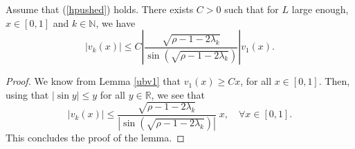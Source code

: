 \documentclass[11pt]{article}
\theoremstyle{plain}
\newtheorem{cor}[lemma]{Corollary}
\begin{document}
\begin{appendix}
%

\begin{lem}
Assume that (\ref{hpushed}) holds. There exists $C>0$ such that for $L$ large enough, $x\in[0,1]$ and $k\in \mathbb{N}$, we have
\begin{equation*}
   \left|{v_k(x)}\right|\leqslant C  \left| \frac{\sqrt{\rho-1-2\lambda_k}}{\sin(\sqrt{\rho-1-2\lambda_k})}\right|v_1(x).
\end{equation*}
\end{lem}
\begin{proof} We know from Lemma \ref{ubv1} that $v_1(x)\geqslant Cx$, for all $x\in[0,1]$. Then, using that $|\sin y|\leqslant y$ for all $y\in\mathbb{R}$, we see that
\begin{equation*}
|v_k(x)|\leqslant \frac{\sqrt{\rho-1-2\lambda_k}}{|\sin(\sqrt{\rho-1-2\lambda_k})|}\; x, \quad \forall x\in[0,1].
\end{equation*}
This concludes the proof of the lemma.
\end{proof}


\end{appendix}
\end{document}
